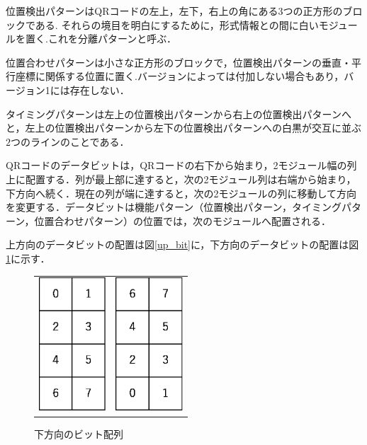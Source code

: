 \documentclass{thesis}
\begin{document}
位置検出パターンはQRコードの左上，左下，右上の角にある3つの正方形のブロックである.
それらの境目を明白にするために，形式情報との間に白いモジュールを置く.これを分離パターンと呼ぶ．

位置合わせパターンは小さな正方形のブロックで，位置検出パターンの垂直・平行座標に関係する位置に置く.バージョンによっては付加しない場合もあり，バージョン1には存在しない．

タイミングパターンは左上の位置検出パターンから右上の位置検出パターンへと，左上の位置検出パターンから左下の位置検出パターンへの白黒が交互に並ぶ$2$つのラインのことである．

QRコードのデータビットは，QRコードの右下から始まり，2モジュール幅の列上に配置する．列が最上部に達すると，次の2モジュール列は右端から始まり，下方向へ続く．現在の列が端に達すると，次の2モジュールの列に移動して方向を変更する．データビットは機能パターン（位置検出パターン，タイミングパターン，位置合わせパターン）の位置では，次のモジュールへ配置される．

上方向のデータビットの配置は図\ref{up_bit}に，下方向のデータビットの配置は図\ref{down_bit}に示す．

\begin{figure}[H]
  \begin{tabular}{cc}
    \begin{minipage}[t]{0.45\hsize}
      \centering
      \includegraphics[width=2.5cm,clip]{pic/up_bit.eps}%
      \caption{上方向のビット配列}
      \label{up_bit}
    \end{minipage} &
    \begin{minipage}[t]{0.45\hsize}
    \centering
      \includegraphics[width=2.5cm,clip]{pic/down_bit.eps}
       \caption{下方向のビット配列}
      \label{down_bit}
      \end{minipage}
  \end{tabular}
\end{figure}
\end{document}
